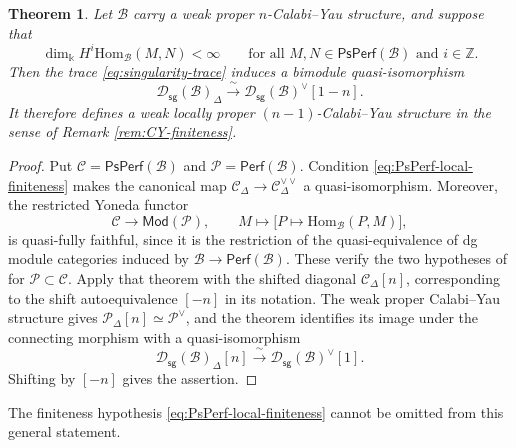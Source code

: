 \documentclass[11pt,letterpaper,reqno]{amsart}
\theoremstyle{plain}
\newtheorem{theorem}{Theorem}[section]
\theoremstyle{definition}
\theoremstyle{plain}
\theoremstyle{definition}
\numberwithin{equation}{section}
\begin{document}
\begin{theorem}\label{thm:singularity-CY}
Let $\mathscr B$ carry a weak proper $n$-Calabi--Yau structure, and suppose that
\begin{equation}\label{eq:PsPerf-local-finiteness}
\dim_{\Bbbk}H^i\mathrm{Hom}_{\mathscr B}(M,N)<\infty
\qquad
\text{for all }M,N\in\mathsf{PsPerf}(\mathscr B)\text{ and }i\in\mathbb Z.
\end{equation}
Then the trace \eqref{eq:singularity-trace} induces a bimodule quasi-isomorphism
\[
\mathscr D_{\mathsf{sg}}(\mathscr B)_\Delta
\xrightarrow{\;\sim\;}\mathscr D_{\mathsf{sg}}(\mathscr B)^\vee[1-n].
\]
It therefore defines a weak locally proper $(n-1)$-Calabi--Yau structure in the sense of Remark \ref{rem:CY-finiteness}.
\end{theorem}
\begin{proof}
Put $\mathscr C=\mathsf{PsPerf}(\mathscr B)$ and $\mathscr P=\mathsf{Perf}(\mathscr B)$.
Condition \eqref{eq:PsPerf-local-finiteness} makes the canonical map $\mathscr C_\Delta\to\mathscr C_\Delta^{\vee\vee}$ a quasi-isomorphism.
Moreover, the restricted Yoneda functor
\[
\mathscr C\longrightarrow\mathsf{Mod}(\mathscr P),
\qquad M\longmapsto\bigl[P\longmapsto\mathrm{Hom}_{\mathscr B}(P,M)\bigr],
\]
is quasi-fully faithful, since it is the restriction of the quasi-equivalence of dg module categories induced by $\mathscr B\to\mathsf{Perf}(\mathscr B)$.
These verify the two hypotheses of \cite[Theorem 4.3.1(b)]{Hanihara-Liu2026} for $\mathscr P\subset\mathscr C$.
Apply that theorem with the shifted diagonal $\mathscr C_\Delta[n]$, corresponding to the shift autoequivalence $[-n]$ in its notation.
The weak proper Calabi--Yau structure gives $\mathscr P_\Delta[n]\simeq\mathscr P^\vee$, and the theorem identifies its image under the connecting morphism with a quasi-isomorphism
\[
\mathscr D_{\mathsf{sg}}(\mathscr B)_\Delta[n]
\xrightarrow{\;\sim\;}\mathscr D_{\mathsf{sg}}(\mathscr B)^\vee[1].
\]
Shifting by $[-n]$ gives the assertion.
\end{proof}

The finiteness hypothesis \eqref{eq:PsPerf-local-finiteness} cannot be omitted from this general statement.
\end{document}
